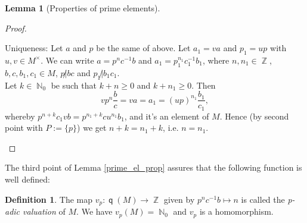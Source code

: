 \documentclass[12pt,a4paper]{report}
\theoremstyle{definition}
\newtheorem{lemma}[theorem]{Lemma}
\newtheorem{defn}[theorem]{Definition}
\theoremstyle{num.custom-title}
\DeclareMathOperator{\N}{\mathbb{N}}
\DeclareMathOperator{\Z}{\mathbb{Z}}
\DeclareMathOperator{\q}{\mathsf{q}}
\begin{document}
\begin{lemma}[Properties of prime elements]
\begin{proof}
\begin{enumerate}
Uniqueness: Let $a$ and $p$ be the same of above. Let $a_1 = va$ and $p_1=up$ with $u,v \in M^\times$. We can write $a=p^nc^{-1}b$ and $a_1 = p_1^{n_1} c_1^{-1} b_1$, where $n,n_1 \in \Z$, $b,c,b_1,c_1 \in M$, $p \not| bc$ and $p_1 \not| b_1c_1$.\\
Let $k \in \N_0$ be such that $k+n \geq 0$ and $k+n_1 \geq 0$. Then 
\[
vp^n \frac{b}{c} = va = a_1 = (up)^{n_1} \frac{b_1}{c_1},
\]
whereby $p^{n+k} c_1 v b = p^{n_1+k} c u^{n_1} b_1$, and it's an element of $M$. Hence (by second point with $P:=\{p\}$) we get $n+k=n_1+k$, i.e. $n=n_1$.
\end{enumerate}
\end{proof}
\end{lemma}

The third point of Lemma \ref{prime_el_prop} assures that the following function is well defined:

\begin{defn}
The map $v_p : \q(M) \to \Z$ given by $p^n c^{-1} b \mapsto n$ is called the \emph{p-adic valuation} of $M$. We have $v_p(M)=\N_0$ and $v_p$ is a homomorphism.
\end{defn}
\end{document}
